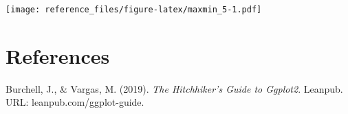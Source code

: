 \documentclass[
]{article}
\begin{document}
\texttt{[image: reference\_files/figure-latex/maxmin\_5-1.pdf]}

\hypertarget{references}{%
\section{References}\label{references}}

Burchell, J., \& Vargas, M. (2019). \emph{The Hitchhiker's Guide to
Ggplot2}. Leanpub. URL: leanpub.com/ggplot-guide.
\end{document}
